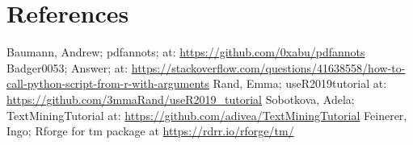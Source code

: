 \documentclass{article}
\begin{document}
\section{References}
Baumann, Andrew; pdfannots; at: \url{https://github.com/0xabu/pdfannots} \newline
Badger0053; Answer; at: \url{https://stackoverflow.com/questions/41638558/how-to-call-python-script-from-r-with-arguments}\newline
Rand, Emma; useR2019\textunderscore tutorial at: \url{https://github.com/3mmaRand/useR2019_tutorial} \newline
Sobotkova, Adela; TextMiningTutorial at:\newline
\url{https://github.com/adivea/TextMiningTutorial} \newline
Feinerer, Ingo; Rforge for tm package at \url{https://rdrr.io/rforge/tm/} \newline
\end{document}
